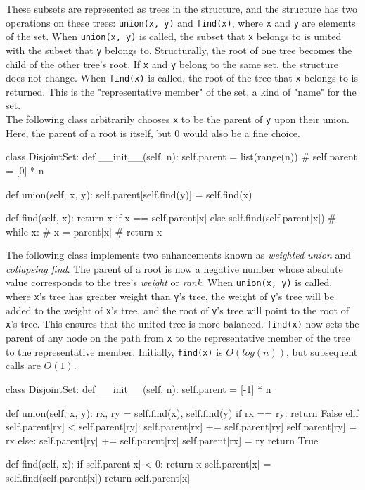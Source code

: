 \documentclass[12pt, titlepage]{article}
\begin{document}
These subsets are represented as trees in the structure, and the structure has two operations on these trees: \texttt{union(x, y)} and \texttt{find(x)}, where \texttt{x} and \texttt{y} are elements of the set. When \texttt{union(x, y)} is called, the subset that \texttt{x} belongs to is united with the subset that \texttt{y} belongs to. Structurally, the root of one tree becomes the child of the other tree's root. If \texttt{x} and \texttt{y} belong to the same set, the structure does not change. When \texttt{find(x)} is called, the root of the tree that \texttt{x} belongs to is returned. This is the "representative member" of the set, a kind of "name" for the set. \\

The following class arbitrarily chooses \texttt{x} to be the parent of \texttt{y} upon their union. Here, the parent of a root is itself, but $0$ would also be a fine choice.
\medskip
\begin{python}
class DisjointSet:
    def __init__(self, n):
        self.parent = list(range(n))
        # self.parent = [0] * n

    def union(self, x, y):
        self.parent[self.find(y)] = self.find(x)

    def find(self, x):
        return x if x == self.parent[x] else self.find(self.parent[x])
        # while x:
        #     x = parent[x]
        # return x
\end{python}
\bigskip

The following class implements two enhancements known as \textit{weighted union} and \textit{collapsing find}. The parent of a root is now a negative number whose absolute value corresponds to the tree's \textit{weight} or \textit{rank}. When \texttt{union(x, y)} is called, where \texttt{x}'s tree has greater weight than \texttt{y}'s tree, the weight of \texttt{y}'s tree will be added to the weight of \texttt{x}'s tree, and the root of \texttt{y}'s tree will point to the root of \texttt{x}'s tree. This ensures that the united tree is more balanced. \texttt{find(x)} now sets the parent of any node on the path from \texttt{x} to the representative member of the tree to the representative member. Initially, \texttt{find(x)} is $O(log(n))$, but subsequent calls are $O(1)$.
\medskip
\begin{python}
class DisjointSet:
    def __init__(self, n):
        self.parent = [-1] * n

    def union(self, x, y):
        rx, ry = self.find(x), self.find(y)
        if rx == ry:
            return False
        elif self.parent[rx] < self.parent[ry]:
            self.parent[rx] += self.parent[ry]
            self.parent[ry] = rx
        else:
            self.parent[ry] += self.parent[rx]
            self.parent[rx] = ry
        return True

    def find(self, x):
        if self.parent[x] < 0:
            return x
        self.parent[x] = self.find(self.parent[x])
        return self.parent[x]
\end{python}
\end{document}
